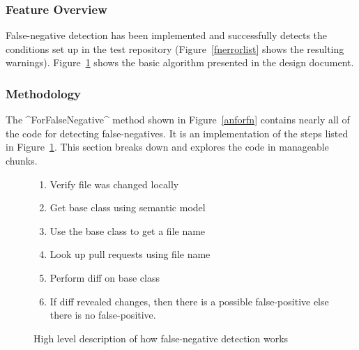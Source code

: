 \documentclass[draftclsnofoot,onecolumn]{IEEEtran}
\begin{document}
\subsubsection{Feature Overview}

False-negative detection has been implemented and successfully detects the conditions set up in the test repository (Figure~\ref{fnerrorlist} shows the resulting warnings). Figure~\ref{fnalgore} shows the basic algorithm presented in the design document.

\subsubsection{Methodology}
The ^ForFalseNegative^ method shown in Figure~\ref{anforfn} contains nearly all of the code for detecting false-negatives. It is an implementation of the steps listed in Figure~\ref{fnalgore}. This section breaks down and explores the code in manageable chunks.

\begin{figure}[h]
\centering
\begin{enumerate}
    \item Verify file was changed locally
    \item Get base class using semantic model
    \item Use the base class to get a file name
    \item Look up pull requests using file name
    \item Perform diff on base class
    \item If diff revealed changes, then there is a possible false-positive 
else there is no false-positive.
\end{enumerate}
\caption{High level description of how false-negative detection works}
\label{fnalgore}
\end{figure}
\end{document}
